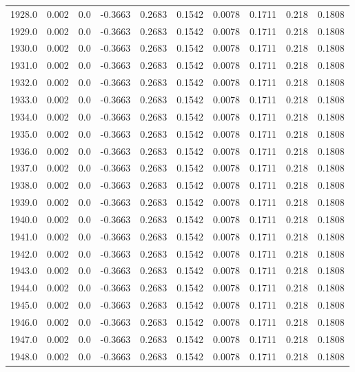 \begin{longtable}{lrrrrrrrrr}
1928.0 & 0.002 & 0.0 & -0.3663 & 0.2683 & 0.1542 & 0.0078 & 0.1711 & 0.218 & 0.1808 \\
1929.0 & 0.002 & 0.0 & -0.3663 & 0.2683 & 0.1542 & 0.0078 & 0.1711 & 0.218 & 0.1808 \\
1930.0 & 0.002 & 0.0 & -0.3663 & 0.2683 & 0.1542 & 0.0078 & 0.1711 & 0.218 & 0.1808 \\
1931.0 & 0.002 & 0.0 & -0.3663 & 0.2683 & 0.1542 & 0.0078 & 0.1711 & 0.218 & 0.1808 \\
1932.0 & 0.002 & 0.0 & -0.3663 & 0.2683 & 0.1542 & 0.0078 & 0.1711 & 0.218 & 0.1808 \\
1933.0 & 0.002 & 0.0 & -0.3663 & 0.2683 & 0.1542 & 0.0078 & 0.1711 & 0.218 & 0.1808 \\
1934.0 & 0.002 & 0.0 & -0.3663 & 0.2683 & 0.1542 & 0.0078 & 0.1711 & 0.218 & 0.1808 \\
1935.0 & 0.002 & 0.0 & -0.3663 & 0.2683 & 0.1542 & 0.0078 & 0.1711 & 0.218 & 0.1808 \\
1936.0 & 0.002 & 0.0 & -0.3663 & 0.2683 & 0.1542 & 0.0078 & 0.1711 & 0.218 & 0.1808 \\
1937.0 & 0.002 & 0.0 & -0.3663 & 0.2683 & 0.1542 & 0.0078 & 0.1711 & 0.218 & 0.1808 \\
1938.0 & 0.002 & 0.0 & -0.3663 & 0.2683 & 0.1542 & 0.0078 & 0.1711 & 0.218 & 0.1808 \\
1939.0 & 0.002 & 0.0 & -0.3663 & 0.2683 & 0.1542 & 0.0078 & 0.1711 & 0.218 & 0.1808 \\
1940.0 & 0.002 & 0.0 & -0.3663 & 0.2683 & 0.1542 & 0.0078 & 0.1711 & 0.218 & 0.1808 \\
1941.0 & 0.002 & 0.0 & -0.3663 & 0.2683 & 0.1542 & 0.0078 & 0.1711 & 0.218 & 0.1808 \\
1942.0 & 0.002 & 0.0 & -0.3663 & 0.2683 & 0.1542 & 0.0078 & 0.1711 & 0.218 & 0.1808 \\
1943.0 & 0.002 & 0.0 & -0.3663 & 0.2683 & 0.1542 & 0.0078 & 0.1711 & 0.218 & 0.1808 \\
1944.0 & 0.002 & 0.0 & -0.3663 & 0.2683 & 0.1542 & 0.0078 & 0.1711 & 0.218 & 0.1808 \\
1945.0 & 0.002 & 0.0 & -0.3663 & 0.2683 & 0.1542 & 0.0078 & 0.1711 & 0.218 & 0.1808 \\
1946.0 & 0.002 & 0.0 & -0.3663 & 0.2683 & 0.1542 & 0.0078 & 0.1711 & 0.218 & 0.1808 \\
1947.0 & 0.002 & 0.0 & -0.3663 & 0.2683 & 0.1542 & 0.0078 & 0.1711 & 0.218 & 0.1808 \\
1948.0 & 0.002 & 0.0 & -0.3663 & 0.2683 & 0.1542 & 0.0078 & 0.1711 & 0.218 & 0.1808 \\

\end{longtable}
